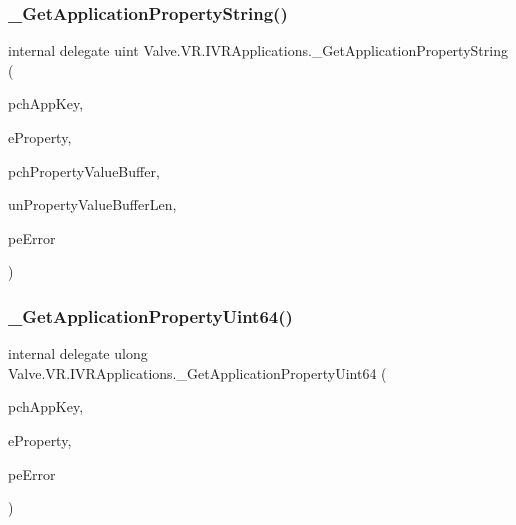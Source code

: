 \subsubsection{\texorpdfstring{\_GetApplicationPropertyString()}{\_GetApplicationPropertyString()}}
{\footnotesize\ttfamily internal delegate uint Valve.\+V\+R.\+I\+V\+R\+Applications.\+\_\+\+Get\+Application\+Property\+String (\begin{DoxyParamCaption}\item[{string}]{pch\+App\+Key,  }\item[{\mbox{\hyperlink{namespace_valve_1_1_v_r_a60802f09ad1b4764cd5bc78369d50bf3}{E\+V\+R\+Application\+Property}}}]{e\+Property,  }\item[{System.\+Text.\+String\+Builder}]{pch\+Property\+Value\+Buffer,  }\item[{uint}]{un\+Property\+Value\+Buffer\+Len,  }\item[{ref \mbox{\hyperlink{namespace_valve_1_1_v_r_a3488adab8a219b579fcee50f4e63a8b6}{E\+V\+R\+Application\+Error}}}]{pe\+Error }\end{DoxyParamCaption})}

\mbox{\label{struct_valve_1_1_v_r_1_1_i_v_r_applications_ac05c82e30b4622cc0e53e7ab75688677}} 
\subsubsection{\texorpdfstring{\_GetApplicationPropertyUint64()}{\_GetApplicationPropertyUint64()}}
{\footnotesize\ttfamily internal delegate ulong Valve.\+V\+R.\+I\+V\+R\+Applications.\+\_\+\+Get\+Application\+Property\+Uint64 (\begin{DoxyParamCaption}\item[{string}]{pch\+App\+Key,  }\item[{\mbox{\hyperlink{namespace_valve_1_1_v_r_a60802f09ad1b4764cd5bc78369d50bf3}{E\+V\+R\+Application\+Property}}}]{e\+Property,  }\item[{ref \mbox{\hyperlink{namespace_valve_1_1_v_r_a3488adab8a219b579fcee50f4e63a8b6}{E\+V\+R\+Application\+Error}}}]{pe\+Error }\end{DoxyParamCaption})}

\mbox{\label{struct_valve_1_1_v_r_1_1_i_v_r_applications_aa203c7e060702643487820541bdca380}} 
